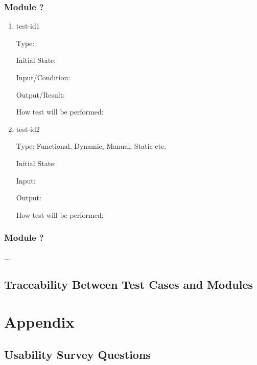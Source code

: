 \documentclass[12pt, titlepage]{article}
\begin{document}
\subsubsection{Module ?}
		
\begin{enumerate}

\item{test-id1\\}

Type: 
					
Initial State: 
					
Input/Condition: 
					
Output/Result: 
					
How test will be performed: 
					
\item{test-id2\\}

Type: Functional, Dynamic, Manual, Static etc.
					
Initial State: 
					
Input: 
					
Output: 
					
How test will be performed: 

\end{enumerate}

\subsubsection{Module ?}

...

\subsection{Traceability Between Test Cases and Modules}

				




\newpage

\section{Appendix}

\subsection{Usability Survey Questions}
\end{document}
